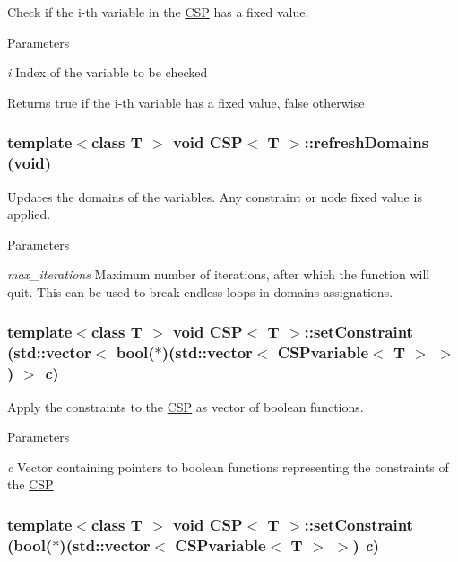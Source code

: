 Check if the i-\/th variable in the \hyperlink{classCSP}{CSP} has a fixed value. 


\begin{DoxyParams}{Parameters}
\item[{\em i}]Index of the variable to be checked \end{DoxyParams}
\begin{DoxyReturn}{Returns}
true if the i-\/th variable has a fixed value, false otherwise 
\end{DoxyReturn}
\hypertarget{classCSP_a466845256e638c5e258fd728b641359f}{
\subsubsection[{refreshDomains}]{\setlength{\rightskip}{0pt plus 5cm}template$<$class T $>$ void {\bf CSP}$<$ T $>$::refreshDomains (void)}}
\label{classCSP_a466845256e638c5e258fd728b641359f}


Updates the domains of the variables. Any constraint or node fixed value is applied. 


\begin{DoxyParams}{Parameters}
\item[{\em max\_\-iterations}]Maximum number of iterations, after which the function will quit. This can be used to break endless loops in domains assignations. \end{DoxyParams}
\hypertarget{classCSP_a457e1df05d4ec16be00118bda22fd882}{
\subsubsection[{setConstraint}]{\setlength{\rightskip}{0pt plus 5cm}template$<$class T $>$ void {\bf CSP}$<$ T $>$::setConstraint (std::vector$<$ bool($\ast$)(std::vector$<$ {\bf CSPvariable}$<$ T $>$ $>$) $>$ {\em c})}}
\label{classCSP_a457e1df05d4ec16be00118bda22fd882}


Apply the constraints to the \hyperlink{classCSP}{CSP} as vector of boolean functions. 


\begin{DoxyParams}{Parameters}
\item[{\em c}]Vector containing pointers to boolean functions representing the constraints of the \hyperlink{classCSP}{CSP} \end{DoxyParams}
\hypertarget{classCSP_a534a0d9bd10fb544f94196bf3c386657}{
\subsubsection[{setConstraint}]{\setlength{\rightskip}{0pt plus 5cm}template$<$class T $>$ void {\bf CSP}$<$ T $>$::setConstraint (bool($\ast$)(std::vector$<$ {\bf CSPvariable}$<$ T $>$ $>$) {\em c})}}
\label{classCSP_a534a0d9bd10fb544f94196bf3c386657}


